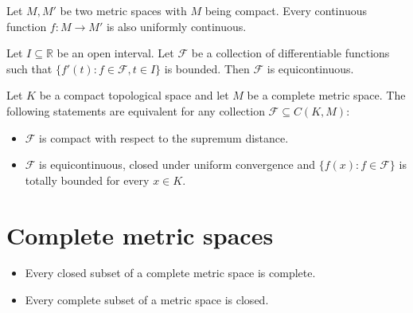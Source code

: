 	\begin{theorem}
		Let $M, M'$ be two metric spaces with $M$ being compact. Every continuous function $f:M\rightarrow M'$ is also uniformly continuous.
	\end{theorem}
	

	
	\begin{property}
		Let $I\subseteq\mathbb{R}$ be an open interval. Let $\mathcal{F}$ be a collection of differentiable functions such that $\{f'(t):f\in\mathcal{F}, t\in I\}$ is bounded. Then $\mathcal{F}$ is equicontinuous.
	\end{property}
	
	\begin{theorem}
		Let $K$ be a compact topological space and let $M$ be a complete metric space. The following statements are equivalent for any collection $\mathcal{F}\subseteq C(K, M)$:
		\begin{itemize}
			\item $\mathcal{F}$ is compact with respect to the supremum distance\footnotemark.
			\item $\mathcal{F}$ is equicontinuous, closed under uniform convergence and $\{f(x):f\in\mathcal{F}\}$ is totally bounded for every $x\in K$.
		\end{itemize}
	\end{theorem}

\section{Complete metric spaces}
	\begin{property}\leavevmode
		\begin{itemize}
			\item Every closed subset of a complete metric space is complete.
			\item Every complete subset of a metric space is closed.
		\end{itemize}

	\end{property}
    
